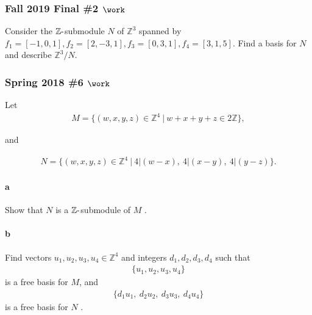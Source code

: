 \hypertarget{fall-2019-final-2-work}{%
\subsubsection{\texorpdfstring{Fall 2019 Final \#2
\(\work\)}{Fall 2019 Final \#2 \textbackslash work}}\label{fall-2019-final-2-work}}

Consider the \({\mathbb{Z}}{\hbox{-}}\)submodule \(N\) of
\({\mathbb{Z}}^3\) spanned by
\(f_1 = [-1, 0, 1], f_2 = [2,-3,1], f_3 = [0, 3, 1], f_4 = [3,1,5]\).
Find a basis for \(N\) and describe \({\mathbb{Z}}^3/N\).

\hypertarget{spring-2018-6-work}{%
\subsubsection{\texorpdfstring{Spring 2018 \#6
\(\work\)}{Spring 2018 \#6 \textbackslash work}}\label{spring-2018-6-work}}

Let
\begin{align*}
M = \{(w, x, y, z) \in {\mathbb{Z}}^4 {~\mathrel{\Big|}~}w + x + y + z \in 2{\mathbb{Z}}\}
,\end{align*}

and

\begin{align*}
N = \{(w, x, y, z) \in {\mathbb{Z}}^4 {~\mathrel{\Big|}~}4\mathrel{\Big|}(w - x),~ 4\mathrel{\Big|}(x - y),~ 4\mathrel{\Big|}( y - z)\}
.\end{align*}

\hypertarget{a-85}{%
\paragraph{a}\label{a-85}}

Show that \(N\) is a \({\mathbb{Z}}{\hbox{-}}\)submodule of \(M\) .

\hypertarget{b-75}{%
\paragraph{b}\label{b-75}}

Find vectors \(u_1 , u_2 , u_3 , u_4 \in {\mathbb{Z}}^4\) and integers
\(d_1 , d_2 , d_3 , d_4\) such that
\begin{align*}
\{u_1 , u_2 , u_3 , u_4 \}
\end{align*}
is a free basis for \(M\), and
\begin{align*}
\{d_1 u_1,~ d_2 u_2,~ d_3 u_3,~ d_4 u_4 \}
\end{align*}
is a free basis for \(N\) .

